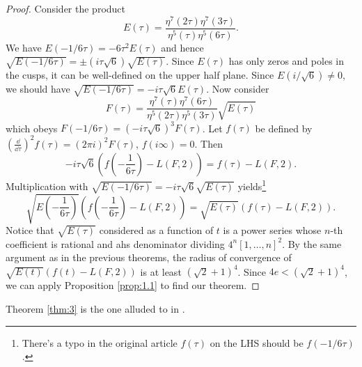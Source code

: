 \begin{proof}
    Consider the product
    $$
        E(\tau) = \frac{\eta^7(2\tau) \eta^7(3 \tau)}{\eta^5(\tau) \eta^5(6\tau)}.
    $$
    We have $E(-1/6\tau) = -6 \tau^2 E(\tau)$ and hence $\sqrt{E(-1/6\tau)} = \pm (i \tau \sqrt{6}) \sqrt{E(\tau)}$.
    Since $E(\tau)$ has only zeros and poles in the cusps, it can be well-defined on the upper half plane.
    Since $E(i/ \sqrt{6}) \ne 0$, we should have $\sqrt{E(-1/6\tau)} = -i \tau \sqrt{6} E(\tau)$. Now consider
    $$
        F(\tau) = \frac{\eta^7(\tau) \eta^7(6\tau)}{\eta^5(2\tau) \eta^5(3\tau)} \sqrt{E(\tau)}
    $$
    which obeys $F(-1/6\tau) = (-i\tau \sqrt{6})^{3} F(\tau)$.
    Let $f(\tau)$ be defined by $(\frac{\dd}{\dd \tau})^{2} f(\tau) = (2 \pi i)^2 F(\tau)$, $f(i\infty) = 0$.
    Then
    $$
        -i\tau \sqrt{6} \left(f\left(-\frac{1}{6\tau}\right) - L(F, 2)\right) = f(\tau) - L(F, 2).
    $$
    Multiplication with $\sqrt{E(-1/6\tau)} = -i\tau \sqrt{6} \sqrt{E(\tau)}$ yields\footnote{There's a typo in the original article $f(\tau)$ on the LHS should be $f(-1/6\tau)$.}
    $$
        \sqrt{E\left(-\frac{1}{6 \tau}\right)} \left(f\left(-\frac{1}{6\tau}\right) - L(F, 2)\right) = \sqrt{E(\tau)} (f(\tau) - L(F, 2)).
    $$
    Notice that $\sqrt{E(\tau)}$ considered as a function of $t$ is a power series whose $n$-th coefficient is rational and ahs denominator dividing $4^n [1, \dots, n]^2$.
    By the same argument as in the previous theorems, the radius of convergence of $\sqrt{E(t)} (f(t) - L(F, 2))$ is at least $(\sqrt{2} + 1)^4$.
    Since $4 e < (\sqrt{2} + 1)^{4}$, we can apply Proposition \ref{prop:1.1} to find our theorem.
\end{proof}

\begin{remark*}
    Theorem \ref{thm:3} is the one alluded to in \cite{beukers1982irrationality}.
\end{remark*}
